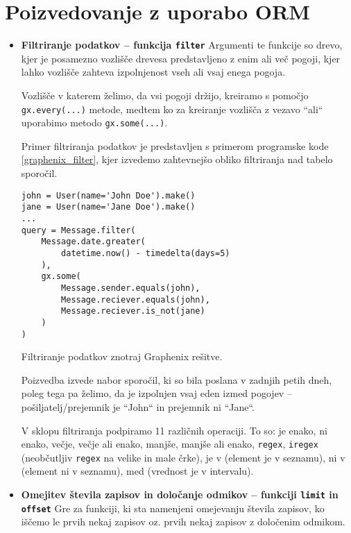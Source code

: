 \documentclass[a4paper,12pt,openright]{book}
\begin{document}
    \section{Poizvedovanje z uporabo ORM}
    \begin{itemize}
        \item \textbf{Filtriranje podatkov – funkcija {\tt filter}}
        \newline
        \noindent
        Argumenti te funkcije so drevo, kjer je posamezno vozlišče drevesa predstavljeno z enim ali več pogoji, kjer lahko vozlišče zahteva izpolnjenost vseh ali vsaj enega pogoja.
        
        Vozlišče v katerem želimo, da vsi pogoji držijo, kreiramo s pomočjo {\tt gx.every(...)} metode, medtem ko za kreiranje vozlišča z vezavo ``ali`` uporabimo metodo {\tt gx.some(...)}.

        Primer filtriranja podatkov je predstavljen s primerom programske kode \ref{graphenix_filter}, kjer izvedemo zahtevnejšo obliko filtriranja nad tabelo sporočil.

\begin{code}
\begin{verbatim}
john = User(name='John Doe').make()
jane = User(name='Jane Doe').make()
...
query = Message.filter(
    Message.date.greater(
        datetime.now() - timedelta(days=5)
    ),
    gx.some(
        Message.sender.equals(john),
        Message.reciever.equals(john),
        Message.reciever.is_not(jane)
    )
)
\end{verbatim}
\caption{Filtriranje podatkov znotraj Graphenix rešitve.}
\label{graphenix_filter}
\end{code}

        \noindent
        Poizvedba izvede nabor sporočil, ki so bila poslana v zadnjih petih dneh, poleg tega pa želimo, da je izpolnjen vsaj eden izmed pogojev – pošiljatelj/prejemnik je ``John`` in prejemnik ni ``Jane``.

        V sklopu filtriranja podpiramo 11 različnih operaciji. To so: je enako, ni enako, večje, večje ali enako, manjše, manjše ali enako, {\tt regex}, {\tt iregex} (neobčutljiv {\tt regex} na velike in male črke), je v (element je v seznamu), ni v (element ni v seznamu), med (vrednost je v intervalu).

        \newpage
        \item \textbf{Omejitev števila zapisov in določanje odmikov – funkciji {\tt limit} in {\tt offset}}
        \newline
        \noindent
        Gre za funkciji, ki sta namenjeni omejevanju števila zapisov, ko iščemo le prvih nekaj zapisov oz. prvih nekaj zapisov z določenim odmikom. 


\end{itemize}
\end{document}
